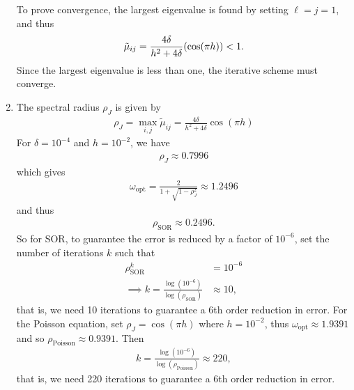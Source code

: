 \documentclass{article} %
\theoremstyle{plain}
\numberwithin{equation}{section} %
\numberwithin{figure}{section} %
\numberwithin{table}{section} %
\begin{document}
\begin{enumerate}[\ \ (a)]
        To prove convergence, the largest eigenvalue is found by setting $\ell = j = 1$, and thus
        \begin{align*}
            \tilde{\mu}_{ij} = \frac{4\delta}{h^2 + 4\delta}\qty(\cos(\pi h)) < 1.
        \end{align*}
        Since the largest eigenvalue is less than one, the iterative scheme must converge.
    \item
        The spectral radius $\rho_J$ is given by
        \begin{align*}
             \rho_J = \displaystyle\max_{i,j}\tilde{\mu}_{ij} = \frac{4\delta}{h^2 + 4\delta}\cos(\pi h)
        \end{align*}
        For $\delta = 10^{-4}$ and $h = 10^{-2}$, we have
        \begin{align*}
            \rho_J \approx 0.7996
        \end{align*}
        which gives
        \begin{align*}
            \omega_\text{opt} = \frac{2}{1 + \sqrt{1 - \rho_J^2}} \approx 1.2496
        \end{align*}
        and thus
        \begin{align*}
            \rho_\text{SOR} \approx 0.2496.
        \end{align*}
        So for SOR, to guarantee the error is reduced by a factor of $10^{-6}$, set the number of iterations $k$ such that
        \begin{align*}
            \rho_\text{SOR}^k &= 10^{-6} \\
            \implies k = \frac{\log(10^{-6})}{\log(\rho_\text{SOR})} &\approx 10,
        \end{align*}
        that is, we need 10 iterations to guarantee a $6$th order reduction in error.  For the Poisson equation, set $\rho_J = \cos(\pi h)$ where $h = 10^{-2}$, thus $\omega_\text{opt} \approx 1.9391$ and so $\rho_\text{Poisson} \approx 0.9391$.  Then
        \begin{align*}
            k = \frac{\log(10^{-6})}{\log(\rho_\text{Poisson})} \approx 220,
        \end{align*}
        that is, we need 220 iterations to guarantee a $6$th order reduction in error.
\end{enumerate}
\end{document}
